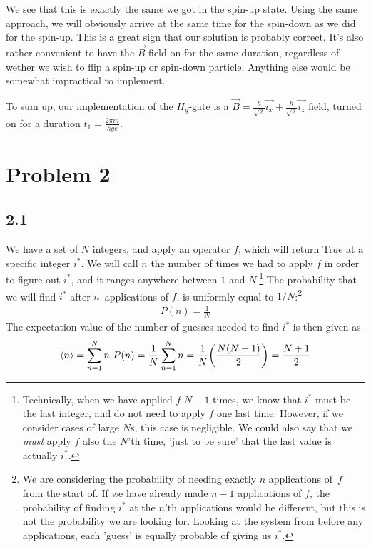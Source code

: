 \documentclass[12p,a4paper]{article}
\newcommand{\0}{\ket{0}}
\newcommand{\1}{\ket{1}}
\begin{document}
We see that this is exactly the same we got in the spin-up state. Using the same approach, we will obviously arrive at the same time for the spin-down as we did for the spin-up. This is a great sign that our solution is probably correct. It's also rather convenient to have the $\vec{B}$-field on for the same duration, regardless of wether we wish to flip a spin-up or spin-down particle. Anything else would be somewhat impractical to implement.

To sum up, our implementation of the $H_g$-gate is a $\vec{B} = \frac{h}{\sqrt{2}}\vec{i_x} + \frac{h}{\sqrt{2}}\vec{i_z}$ field, turned on for a duration $ t_1 = \frac{2\pi m}{h g e}$.

\section*{Problem 2}
\subsection*{2.1}
We have a set of $N$ integers, and apply an operator $f$, which will return True at a specific integer $i^*$. We will call $n$ the number of times we had to apply $f$ in order to figure out $i^*$, and it ranges anywhere between $1$ and $N$.\footnote{Technically, when we have applied $f$ $N-1$ times, we know that $i^*$ must be the last integer, and do not need to apply $f$ one last time. However, if we consider cases of large $N$s, this case is negligible. We could also say that we \textit{must} apply $f$ also the $N$'th time, 'just to be sure' that the last value is actually $i^*$.} The probability that we will find $i^*$ after $n$ applications of $f$, is uniformly equal to $1/N$:\footnote{We are considering the probability of needing exactly $n$ applications of $f$ from the start of. If we have already made $n-1$ applications of $f$, the probability of finding $i^*$ at the $n$'th applications would be different, but this is not the probability we are looking for. Looking at the system from before any applications, each 'guess' is equally probable of giving us $i^*$.}
\begin{align*}
    P(n) = \frac{1}{N}
\end{align*}
The expectation value of the number of guesses needed to find $i^*$ is then given as
\begin{align*}
    \langle n \rangle = \sum\limits_{n=1}^N n\ P(n) = \frac{1}{N}\sum\limits_{n=1}^N n = \frac{1}{N}\qty(\frac{N(N+1)}{2}) = \frac{N+1}{2}
\end{align*}
\end{document}
